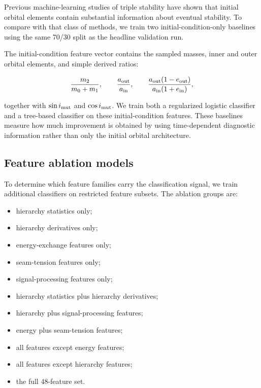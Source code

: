 \documentclass[12pt,a4paper]{article}
\begin{document}
Previous machine-learning studies of triple stability have shown that initial orbital elements contain substantial information about eventual stability. To compare with that class of methods, we train two initial-condition-only baselines using the same 70/30 split as the headline validation run.

The initial-condition feature vector contains the sampled masses, inner and outer orbital elements, and simple derived ratios:

\begin{equation}
    \frac{m_2}{m_0+m_1},\qquad
    \frac{a_{\rm out}}{a_{\rm in}},\qquad
    \frac{a_{\rm out}(1-e_{\rm out})}{a_{\rm in}(1+e_{\rm in})},
    \label{eq:initial_ratios}
\end{equation}

together with \(\sin i_{\rm mut}\) and \(\cos i_{\rm mut}\). We train both a regularized logistic classifier and a tree-based classifier on these initial-condition features. These baselines measure how much improvement is obtained by using time-dependent diagnostic information rather than only the initial orbital architecture.

\subsection{Feature ablation models}
\label{sec:ablation_models}

To determine which feature families carry the classification signal, we train additional classifiers on restricted feature subsets. The ablation groups are:

\begin{itemize}
    \item hierarchy statistics only;
    \item hierarchy derivatives only;
    \item energy-exchange features only;
    \item seam-tension features only;
    \item signal-processing features only;
    \item hierarchy statistics plus hierarchy derivatives;
    \item hierarchy plus signal-processing features;
    \item energy plus seam-tension features;
    \item all features except energy features;
    \item all features except hierarchy features;
    \item the full 48-feature set.
\end{itemize}
\end{document}
